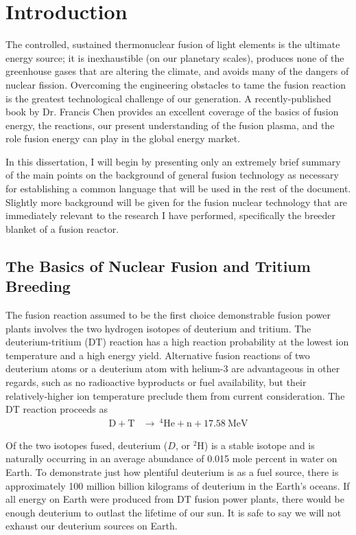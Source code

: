 \chapter{Introduction} \label{sec:introduction}
The controlled, sustained thermonuclear fusion of light elements is the ultimate energy source; it is inexhaustible (on our planetary scales), produces none of the greenhouse gases that are altering the climate, and avoids many of the dangers of nuclear fission. Overcoming the engineering obstacles to tame the fusion reaction is the greatest technological challenge of our generation. A recently-published book by Dr. Francis Chen provides an excellent coverage of the basics of fusion energy, the reactions, our present understanding of the fusion plasma, and the role fusion energy can play in the global energy market.\cite{Chen2011} 

In this dissertation, I will begin by presenting only an extremely brief summary of the main points on the background of general fusion technology as necessary for establishing a common language that will be used in the rest of the document. Slightly more background will be given for the fusion nuclear technology that are immediately relevant to the research I have performed, specifically the breeder blanket of a fusion reactor.

\section{The Basics of Nuclear Fusion and Tritium Breeding}\label{sec:fusion-basics}

The fusion reaction assumed to be the first choice demonstrable fusion power plants involves the two hydrogen isotopes of deuterium and tritium. The deuterium-tritium (DT) reaction has a high reaction probability at the lowest ion temperature and a high energy yield. Alternative fusion reactions of two deuterium atoms or a deuterium atom with helium-3 are advantageous in other regards, such as no radioactive byproducts or fuel availability, but their relatively-higher ion temperature preclude them from current consideration.\cite{abdou} The DT reaction proceeds as
\begin{align}
	\mathrm{D} + \mathrm{T}&\xrightarrow{}\ ^4\mathrm{He}+\mathrm{n}+17.58\ \text{MeV} \label{eq:dt-reaction}
\end{align}

Of the two isotopes fused, deuterium ($D$, or $^2$H) is a stable isotope and is naturally occurring in an average abundance of 0.015 mole percent in water on Earth. To demonstrate just how plentiful deuterium is as a fuel source, there is approximately 100 million billion kilograms of deuterium in the Earth's oceans. If all energy on Earth were produced from DT fusion power plants, there would be enough deuterium to outlast the lifetime of our sun. It is safe to say we will not exhaust our deuterium sources on Earth.

